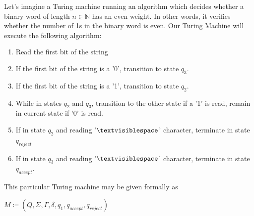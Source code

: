 \documentclass{article}
\begin{document}
\begin{exmp}
Let's imagine a Turing machine running an algorithm which decides whether a binary word of length $n \in \mathbb{N}$ has an even weight.  In other words, it verifies whether the number of 1s in the binary word is even.  Our Turing Machine will execute the following algorithm:
\begin{enumerate}
	\item Read the first bit of the string
	\item If the first bit of the string is a '0', transition to state $q_{3}$.
	\item If the first bit of the string is a '1', transition to state $q_{2}$.
	\item While in states $q_{2}$ and $q_{3}$, transition to the other state if a '1' is read, remain in current state if '0' is read.
	\item If in state $q_{2}$ and reading '$\textvisiblespace$' character, terminate in state $q_{reject}$
	\item If in state $q_{3}$ and reading '$\textvisiblespace$' character, terminate in state $q_{accept}$.
\end{enumerate}
\noindent This particular Turing machine may be given formally as \\

\centerline{$M \coloneq (Q, \Sigma, \Gamma, \delta, q_{1}, q_{accept}, q_{reject})$}


\end{exmp}
\end{document}
